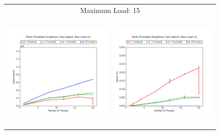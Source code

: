 \begin{figure}[h!]
\begin{tabular}{|cc|}
        \hline 
        \multicolumn{2}{|c|}{{\footnotesize Maximum Load: 15}}\\
        \includegraphics[height=2.25in]{maps/15HM10K:F34,I33,E33speed.png} &
    \includegraphics[height=2.25in]{maps/15HM10K:F34,I33,E33aborts.png}\\
    \hline 
    \end{tabular}
\label{fig:ntqueues}
\end{figure}
